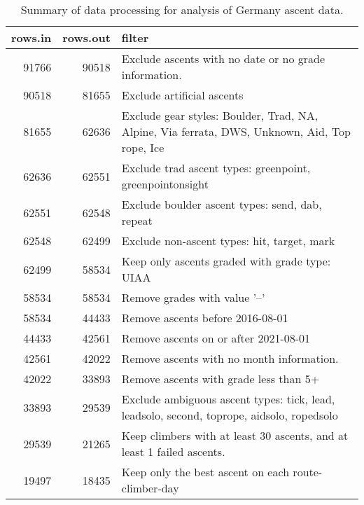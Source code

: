 \begin{table}[ht]
\centering
\begingroup\fontsize{9pt}{10pt}\selectfont
\begin{tabular}{rrl}
  \hline
{\bf rows.in} & {\bf rows.out} & {\bf filter} \\ 
  \hline
91766 & 90518 & Exclude ascents with no date or no grade information. \\ 
  90518 & 81655 & Exclude artificial ascents \\ 
  81655 & 62636 & Exclude gear styles: Boulder, Trad, NA, Alpine, Via ferrata, DWS, Unknown, Aid, Top rope, Ice \\ 
  62636 & 62551 & Exclude trad ascent types: greenpoint, greenpointonsight \\ 
  62551 & 62548 & Exclude boulder ascent types: send, dab, repeat \\ 
  62548 & 62499 & Exclude non-ascent types: hit, target, mark \\ 
  62499 & 58534 & Keep only ascents graded with grade type: UIAA \\ 
  58534 & 58534 & Remove grades with value '--' \\ 
  58534 & 44433 & Remove ascents before 2016-08-01 \\ 
  44433 & 42561 & Remove ascents on or after 2021-08-01 \\ 
  42561 & 42022 & Remove ascents with no month information. \\ 
  42022 & 33893 & Remove ascents with grade less than 5+ \\ 
  33893 & 29539 & Exclude ambiguous ascent types: tick, lead, leadsolo, second, toprope, aidsolo, ropedsolo \\ 
  29539 & 21265 & Keep climbers with at least 30 ascents, and at least 1 failed ascents. \\ 
  19497 & 18435 & Keep only the best ascent on each route-climber-day \\ 
   \hline
\end{tabular}
\endgroup
\caption{Summary of data processing for analysis of Germany ascent data.} 
\label{table-data-processing-germany}
\end{table}
